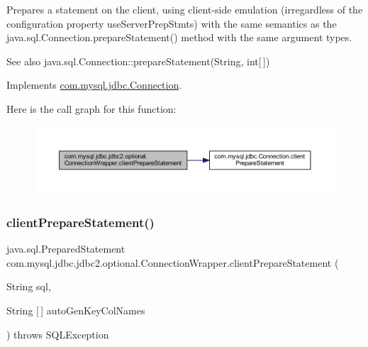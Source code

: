 Prepares a statement on the client, using client-\/side emulation (irregardless of the configuration property \textquotesingle{}use\+Server\+Prep\+Stmts\textquotesingle{}) with the same semantics as the java.\+sql.\+Connection.\+prepare\+Statement() method with the same argument types.

\begin{DoxySeeAlso}{See also}
java.\+sql.\+Connection\+::prepare\+Statement(\+String, int\mbox{[}$\,$\mbox{]}) 
\end{DoxySeeAlso}


Implements \mbox{\hyperlink{interfacecom_1_1mysql_1_1jdbc_1_1_connection_a0a5607f53ef9d376f1ff02fcffd038bf}{com.\+mysql.\+jdbc.\+Connection}}.

Here is the call graph for this function\+:
\nopagebreak
\begin{figure}[H]
\begin{center}
\leavevmode
\includegraphics[width=350pt]{classcom_1_1mysql_1_1jdbc_1_1jdbc2_1_1optional_1_1_connection_wrapper_a2553dc69e9e6f8026ed0bf4911a9e417_cgraph}
\end{center}
\end{figure}
\mbox{\label{classcom_1_1mysql_1_1jdbc_1_1jdbc2_1_1optional_1_1_connection_wrapper_a7d857e3e39f13e33451b0f491adbd573}} 
\subsubsection{\texorpdfstring{client\+Prepare\+Statement()}{clientPrepareStatement()}\hspace{0.1cm}{\footnotesize\ttfamily [6/6]}}
{\footnotesize\ttfamily java.\+sql.\+Prepared\+Statement com.\+mysql.\+jdbc.\+jdbc2.\+optional.\+Connection\+Wrapper.\+client\+Prepare\+Statement (\begin{DoxyParamCaption}\item[{String}]{sql,  }\item[{String \mbox{[}$\,$\mbox{]}}]{auto\+Gen\+Key\+Col\+Names }\end{DoxyParamCaption}) throws S\+Q\+L\+Exception}

